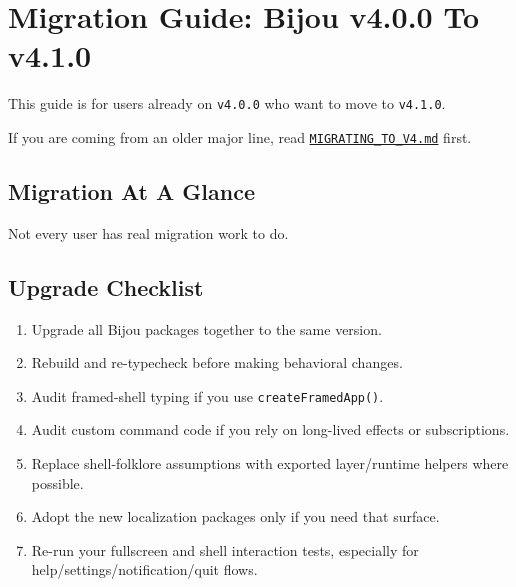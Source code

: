 \chapter{Migration Guide: Bijou v4.0.0 To v4.1.0}\label{record-264}

\smallskip

This guide is for users already on \texttt{v\allowbreak{}4\allowbreak{}.\allowbreak{}0\allowbreak{}.\allowbreak{}0} who want to move to \texttt{v\allowbreak{}4\allowbreak{}.\allowbreak{}1\allowbreak{}.\allowbreak{}0}.

If you are coming from an older major line, read \href{https://github.com/flyingrobots/bijou/blob/cbd70612140e7a450d764b3c7be1c6af878b99bc/docs/MIGRATING_TO_V4.md}{\texttt{M\allowbreak{}I\allowbreak{}G\allowbreak{}R\allowbreak{}A\allowbreak{}T\allowbreak{}I\allowbreak{}N\allowbreak{}G\allowbreak{}\_\allowbreak{}T\allowbreak{}O\allowbreak{}\_\allowbreak{}V\allowbreak{}4\allowbreak{}.\allowbreak{}m\allowbreak{}d}} first.

\section{Migration At A Glance}\label{record-264-migration-at-a-glance}

Not every user has real migration work to do.



\section{Upgrade Checklist}\label{record-264-upgrade-checklist}

\begin{enumerate}
\def\labelenumi{\arabic{enumi}.}
\tightlist
\item
  Upgrade all Bijou packages together to the same version.
\item
  Rebuild and re-typecheck before making behavioral changes.
\item
  Audit framed-shell typing if you use \texttt{c\allowbreak{}r\allowbreak{}e\allowbreak{}a\allowbreak{}t\allowbreak{}e\allowbreak{}F\allowbreak{}r\allowbreak{}a\allowbreak{}m\allowbreak{}e\allowbreak{}d\allowbreak{}A\allowbreak{}p\allowbreak{}p\allowbreak{}(\allowbreak{})}.
\item
  Audit custom command code if you rely on long-lived effects or subscriptions.
\item
  Replace shell-folklore assumptions with exported layer/runtime helpers where possible.
\item
  Adopt the new localization packages only if you need that surface.
\item
  Re-run your fullscreen and shell interaction tests, especially for help/settings/notification/quit flows.
\end{enumerate}

